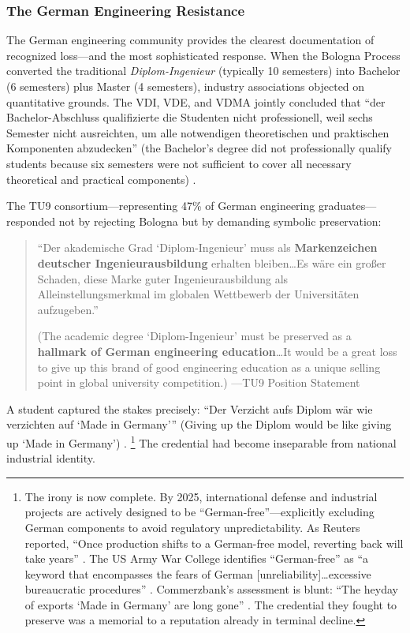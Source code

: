 \subsubsection{The German Engineering Resistance}

The German engineering community provides the clearest documentation of recognized loss---and the most sophisticated response. When the Bologna Process converted the traditional \textit{Diplom-Ingenieur} (typically 10 semesters) into Bachelor (6 semesters) plus Master (4 semesters), industry associations objected on quantitative grounds. The VDI, VDE, and VDMA jointly concluded that ``der Bachelor-Abschluss qualifizierte die Studenten nicht professionell, weil sechs Semester nicht ausreichten, um alle notwendigen theoretischen und praktischen Komponenten abzudecken'' (the Bachelor's degree did not professionally qualify students because six semesters were not sufficient to cover all necessary theoretical and practical components) \citep{lucasnuelle2009}.

The TU9 consortium---representing 47\% of German engineering graduates---responded not by rejecting Bologna but by demanding symbolic preservation:

\begin{quote}
``Der akademische Grad `Diplom-Ingenieur' muss als \textbf{Markenzeichen deutscher Ingenieurausbildung} erhalten bleiben\ldots Es wäre ein großer Schaden, diese Marke guter Ingenieurausbildung als Alleinstellungsmerkmal im globalen Wettbewerb der Universitäten aufzugeben.''

(The academic degree `Diplom-Ingenieur' must be preserved as a \textbf{hallmark of German engineering education}\ldots It would be a great loss to give up this brand of good engineering education as a unique selling point in global university competition.)
---TU9 Position Statement \citeyearpar{tu92010}
\end{quote}

A student captured the stakes precisely: ``Der Verzicht aufs Diplom wär wie verzichten auf `Made in Germany''' (Giving up the Diplom would be like giving up `Made in Germany') \citep{deutschlandfunk2010}.%
\footnote{The irony is now complete. By 2025, international defense and industrial projects are actively designed to be ``German-free''---explicitly excluding German components to avoid regulatory unpredictability. As Reuters reported, ``Once production shifts to a German-free model, reverting back will take years'' \citep{shalal2019}. The US Army War College identifies ``German-free'' as ``a keyword that encompasses the fears of German [unreliability]\ldots excessive bureaucratic procedures'' \citep{deni2025}. Commerzbank's assessment is blunt: ``The heyday of exports `Made in Germany' are long gone'' \citep{kramer2024}. The credential they fought to preserve was a memorial to a reputation already in terminal decline.}
The credential had become inseparable from national industrial identity.

